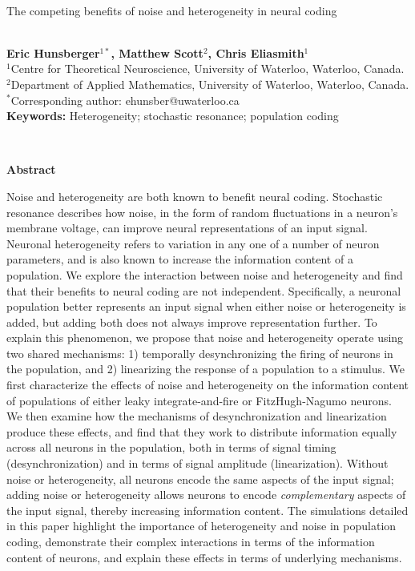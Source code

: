 \documentclass[12pt]{article}
\begin{document}
\hspace{13.9cm}

\ \vspace{20mm}\\

{\LARGE The competing benefits of noise and heterogeneity in neural coding}

\ \\
{\bf \large Eric Hunsberger$^{1*}$, Matthew Scott$^2$, Chris Eliasmith$^1$}\\
{$^1$Centre for Theoretical Neuroscience, University of Waterloo, Waterloo, Canada.}\\
{$^2$Department of Applied Mathematics, University of Waterloo, Waterloo, Canada.}\\
{$^*$Corresponding author: ehunsber@uwaterloo.ca}\\
%

{\bf Keywords:} Heterogeneity; stochastic resonance; population coding

\thispagestyle{empty}
%
\ \vspace{-0mm}\\
%
\begin{center} {\bf Abstract} \end{center}

Noise and heterogeneity are both known to benefit neural coding.
Stochastic resonance describes how noise,
in the form of random fluctuations in a neuron's membrane voltage,
can improve neural representations of an input signal.
Neuronal heterogeneity refers to variation in any one of a number of neuron parameters,
and is also known to increase the information content of a population.
We explore the interaction between noise and heterogeneity
and find that their benefits to neural coding are not independent.
Specifically, a neuronal population better represents an input signal
when either noise or heterogeneity is added,
but adding both does not always improve representation further.
To explain this phenomenon, we propose
that noise and heterogeneity operate using two shared mechanisms:
1) temporally desynchronizing the firing of neurons in the population,
and 2) linearizing the response of a population to a stimulus.
We first characterize the effects of noise and heterogeneity
on the information content of populations of
either leaky integrate-and-fire or FitzHugh-Nagumo neurons.
We then examine how the mechanisms
of desynchronization and linearization produce these effects,
and find that they work to distribute information equally across all neurons in the population,
both in terms of signal timing (desynchronization) and in terms of signal amplitude (linearization).
Without noise or heterogeneity,
all neurons encode the same aspects of the input signal;
adding noise or heterogeneity allows neurons
to encode \emph{complementary} aspects of the input signal,
thereby increasing information content.
The simulations detailed in this paper
highlight the importance of heterogeneity and noise in population coding,
demonstrate their complex interactions in terms of the information content of neurons,
and explain these effects in terms of underlying mechanisms.
\end{document}

